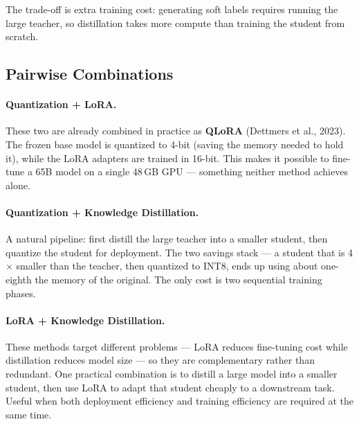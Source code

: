 \documentclass[11pt,a4paper]{article}
\begin{document}
The trade-off is extra training cost: generating soft labels requires running
the large teacher, so distillation takes more compute than training the student
from scratch.

\subsection*{Pairwise Combinations}

\paragraph{Quantization + LoRA.}
These two are already combined in practice as \textbf{QLoRA} (Dettmers et al.,
2023). The frozen base model is quantized to 4-bit (saving the memory needed to
hold it), while the LoRA adapters are trained in 16-bit. This makes it possible
to fine-tune a 65B model on a single 48\,GB GPU --- something neither method
achieves alone.

\paragraph{Quantization + Knowledge Distillation.}
A natural pipeline: first distill the large teacher into a smaller student,
then quantize the student for deployment. The two savings stack --- a student
that is 4$\times$ smaller than the teacher, then quantized to INT8, ends up
using about one-eighth the memory of the original. The only cost is two
sequential training phases.

\paragraph{LoRA + Knowledge Distillation.}
These methods target different problems --- LoRA reduces fine-tuning cost while
distillation reduces model size --- so they are complementary rather than
redundant. One practical combination is to distill a large model into a smaller
student, then use LoRA to adapt that student cheaply to a downstream task.
Useful when both deployment efficiency and training efficiency are required at
the same time.
\end{document}
